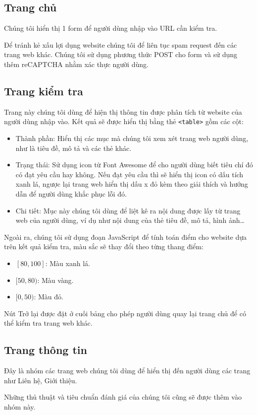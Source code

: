 \subsection{Trang chủ}
Chúng tôi hiển thị 1 form để người dùng nhập vào URL cần kiểm tra.
\par
Để tránh kẻ xấu lợi dụng website chúng tôi để liên tục spam request đến các trang web khác. Chúng tôi sử dụng phương thức POST cho form và sử dụng thêm reCAPTCHA nhằm xác thực người dùng.
\subsection{Trang kiểm tra}
Trang này chúng tôi dùng để hiện thị thông tin được phân tích từ website của người dùng nhập vào. Kết quả sẽ được hiển thị bằng thẻ \texttt{<table>} gồm các cột:
\begin{itemize}
	\item Thành phần: Hiển thị các mục mà chúng tôi xem xét trang web người dùng, như là tiêu đề, mô tả và các thẻ khác.
	\item Trạng thái: Sử dụng icon từ Font Awesome để cho người dùng biết tiêu chí đó có đạt yêu cầu hay không. Nếu đạt yêu cầu thì sẽ hiển thị icon có dấu tích xanh lá, ngược lại trang web hiển thị dấu x đỏ kèm theo giải thích và hướng dẫn để người dùng khắc phục lỗi đó.
	\item Chi tiết: Mục này chúng tôi dùng để liệt kê ra nội dung được lấy từ trang web của người dùng, ví dụ như nội dung của thẻ tiêu đề, mô tả, hình ảnh\ldots
\end{itemize}
\par
Ngoài ra, chúng tôi sử dụng đoạn JavaScript để tính toán điểm cho website dựa trên kết quả kiểm tra, màu sắc sẽ thay đổi theo từng thang điểm:
\begin{itemize}
	\item $[80, 100]$: Màu xanh lá.
	\item $[50, 80)$: Màu vàng.
	\item $[0, 50)$: Màu đỏ.
\end{itemize}
\par
Nút Trở lại được đặt ở cuối bảng cho phép người dùng quay lại trang chủ để có thể kiểm tra trang web khác.
\subsection{Trang thông tin}
Đây là nhóm các trang web chúng tôi dùng để hiển thị đến người dùng các trang như Liên hệ, Giới thiệu.
\par
Những thủ thuật và tiêu chuẩn đánh giá của chúng tôi cũng sẽ được thêm vào nhóm này.
